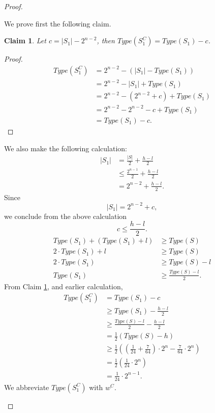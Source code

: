 \documentclass[12pt]{ucthesis}
\theoremstyle{plain}
\newtheorem{claim}{Claim}
\theoremstyle{definition}
\begin{document}
\begin{proof}
\begin{enumerate}[(1)]
	We prove first the following claim.
	\begin{claim}
	\label{Claim 7}
	Let $c = |S_1| - 2^{n - 2}$, then $Type(S_1^C) = Type(S_1) - c$.
	\end{claim}
	\begin{proof}
	\begin{align*}
	Type(S_1^C)
	& = 2^{n - 2} - (|S_1| - Type(S_1)) \\
	& = 2^{n - 2} - |S_1| + Type(S_1) \\
	& = 2^{n - 2} - (2^{n - 2} + c) + Type(S_1) \\
	& = 2^{n - 2} - 2^{n - 2} - c + Type(S_1) \\
	& = Type(S_1) - c.
	\end{align*}
	\end{proof}
	We also make the following calculation:
	\begin{align*}
	|S_1| & = \frac{|S|}{2} + \frac{h - l}{2} \\
	      & \le \frac{2^{n - 1}}{2} + \frac{h - l}{2} \\
	      & = 2^{n - 2} + \frac{h - l}{2}.
	\end{align*}
	Since
	\begin{equation*}
	|S_1| = 2^{n - 2} + c,
	\end{equation*}
	we conclude from the above calculation
	\begin{equation*}
	c \le \frac{h - l}{2}.
	\end{equation*}
	\begin{align*}
	Type(S_1) + (Type(S_1) + l) & \ge Type(S) \\
	2 \cdot Type(S_1) + l & \ge Type(S) \\
	2 \cdot Type(S_1) & \ge Type(S) - l \\
	Type(S_1) & \ge \frac{Type(S) - l}{2}.
	\end{align*}
	From Claim \ref{Claim 7}, and earlier calculation,
	\begin{align*}
	Type(S_1^C)
	& = Type(S_1) - c \\
	& \ge Type(S_1) - \frac{h - l}{2} \\
	& \ge \frac{Type(S) - l}{2} - \frac{h - l}{2} \\
	& = \frac{1}{2} (Type(S) - h) \\
	& \ge \frac{1}{2} ((\frac{1}{24} + \frac{7}{64}) \cdot 2^n - \frac{7}{64} \cdot 2^n) \\
	& = \frac{1}{2} (\frac{1}{24} \cdot 2^n) \\
	& = \frac{1}{24} \cdot 2^{n - 1}.
	\end{align*}
	We abbreviate $Type(S_1^C)$ with $w^C$.


\end{enumerate}
\end{proof}
\end{document}
